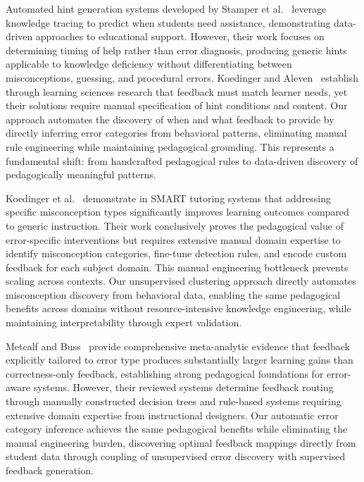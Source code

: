 \documentclass[conference]{IEEEtran}
\begin{document}
Automated hint generation systems developed by Stamper et al.~\cite{stamper2011} leverage knowledge tracing to predict when students need assistance, demonstrating data-driven approaches to educational support. However, their work focuses on determining timing of help rather than error diagnosis, producing generic hints applicable to knowledge deficiency without differentiating between misconceptions, guessing, and procedural errors. Koedinger and Aleven~\cite{koedinger2007} establish through learning sciences research that feedback must match learner needs, yet their solutions require manual specification of hint conditions and content. Our approach automates the discovery of when and what feedback to provide by directly inferring error categories from behavioral patterns, eliminating manual rule engineering while maintaining pedagogical grounding. This represents a fundamental shift: from handcrafted pedagogical rules to data-driven discovery of pedagogically meaningful patterns.

Koedinger et al.~\cite{koedinger2012} demonstrate in SMART tutoring systems that addressing specific misconception types significantly improves learning outcomes compared to generic instruction. Their work conclusively proves the pedagogical value of error-specific interventions but requires extensive manual domain expertise to identify misconception categories, fine-tune detection rules, and encode custom feedback for each subject domain. This manual engineering bottleneck prevents scaling across contexts. Our unsupervised clustering approach directly automates misconception discovery from behavioral data, enabling the same pedagogical benefits across domains without resource-intensive knowledge engineering, while maintaining interpretability through expert validation.

Metcalf and Buss~\cite{metcalf2020} provide comprehensive meta-analytic evidence that feedback explicitly tailored to error type produces substantially larger learning gains than correctness-only feedback, establishing strong pedagogical foundations for error-aware systems. However, their reviewed systems determine feedback routing through manually constructed decision trees and rule-based systems requiring extensive domain expertise from instructional designers. Our automatic error category inference achieves the same pedagogical benefits while eliminating the manual engineering burden, discovering optimal feedback mappings directly from student data through coupling of unsupervised error discovery with supervised feedback generation.
\end{document}
